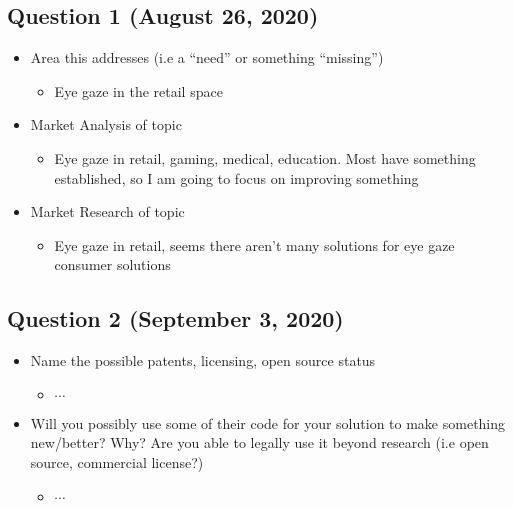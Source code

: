 \documentclass{article}
\begin{document}
\subsection*{\Large\textbf{Question 1 (August 26, 2020)}}
\begin{itemize}
 \item Area this addresses (i.e a “need” or something “missing”)
 \begin{itemize}
   \item Eye gaze in the retail space
 \end{itemize}
 \item Market Analysis of topic
 \begin{itemize}
   \item Eye gaze in retail, gaming, medical, education. Most have something established, so I am going to focus on improving something
 \end{itemize}
 \item Market Research of topic
 \begin{itemize}
   \item Eye gaze in retail, seems there aren’t many solutions for eye gaze consumer solutions
 \end{itemize}
\end{itemize}
\subsection*{\Large\textbf{Question 2 (September 3, 2020)}}
\begin{itemize}
 \item Name the possible patents, licensing, open source status
 \begin{itemize}
   \item \(\cdots \)
 \end{itemize}
 \item Will you possibly use some of their code for your solution to
 make something new/better? Why? Are you able to legally use it beyond research (i.e open source, commercial license?)
 \begin{itemize}
   \item \(\cdots \)
 \end{itemize}
\end{itemize}
\end{document}
